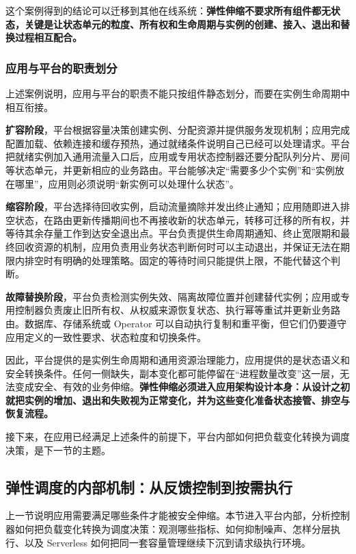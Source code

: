 这个案例得到的结论可以迁移到其他在线系统：\textbf{弹性伸缩不要求所有组件都无状态，关键是让状态单元的粒度、所有权和生命周期与实例的创建、接入、退出和替换过程相互配合。}

\subsubsection{应用与平台的职责划分}

上述案例说明，应用与平台的职责不能只按组件静态划分，而要在实例生命周期中相互衔接。

\textbf{扩容阶段}，平台根据容量决策创建实例、分配资源并提供服务发现机制；应用完成配置加载、依赖连接和缓存预热，通过就绪条件说明自己已经可以处理请求。平台把就绪实例加入通用流量入口后，应用或专用状态控制器还要分配队列分片、房间等状态单元，并更新相应的业务路由。平台能够决定“需要多少个实例”和“实例放在哪里”，应用则必须说明“新实例可以处理什么状态”。

\textbf{缩容阶段}，平台选择待回收实例，启动流量摘除并发出终止通知；应用随即进入排空状态，在路由更新传播期间也不再接收新的状态单元，转移可迁移的所有权，并等待其余存量工作到达安全退出点。平台负责提供生命周期通知、终止宽限期和最终回收资源的机制，应用负责用业务状态判断何时可以主动退出，并保证无法在期限内排空时有明确的处理策略。固定的等待时间只能提供上限，不能代替这个判断。

\textbf{故障替换阶段}，平台负责检测实例失效、隔离故障位置并创建替代实例；应用或专用控制器负责废止旧所有权、从权威来源恢复状态、执行幂等重试并更新业务路由。数据库、存储系统或 Operator 可以自动执行复制和重平衡，但它们仍要遵守应用定义的一致性要求、状态粒度和切换条件。

因此，平台提供的是实例生命周期和通用资源治理能力，应用提供的是状态语义和安全转换条件。任何一侧缺失，副本变化都可能停留在“进程数量改变”这一层，无法变成安全、有效的业务伸缩。\textbf{弹性伸缩必须进入应用架构设计本身：从设计之初就把实例的增加、退出和失败视为正常变化，并为这些变化准备状态接管、排空与恢复流程。}

接下来，在应用已经满足上述条件的前提下，平台内部如何把负载变化转换为调度决策，是下一节的主题。


\subsection{弹性调度的内部机制：从反馈控制到按需执行}
\label{sec6:elastic-scheduling}
\label{sec6:hpa-to-serverless}

上一节说明应用需要满足哪些条件才能被安全伸缩。本节进入平台内部，分析控制器如何把负载变化转换为调度决策：观测哪些指标、如何抑制噪声、怎样分层执行、以及 Serverless 如何把同一套容量管理继续下沉到请求级执行环境。

